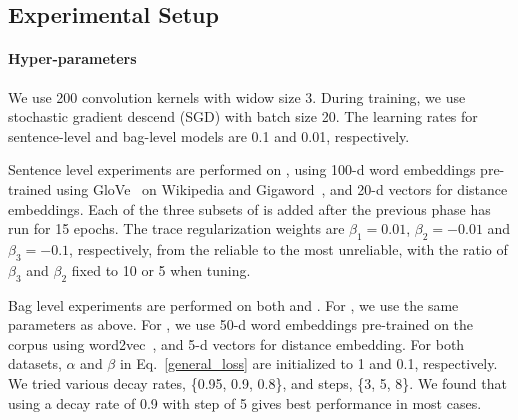 \subsection{Experimental Setup}
%
%
\paragraph{Hyper-parameters}
We use 200 convolution kernels with widow size 3. During training, we use stochastic gradient descend (SGD) with batch size 20.  The learning rates for sentence-level  and bag-level models are 0.1 and 0.01, respectively.
%
%

Sentence level experiments are performed on \TimeRE, 
using %
100-d word embeddings pre-trained using GloVe~\cite{pennington2014glove} on Wikipedia and Gigaword~\cite{parker2011english}, 
and 20-d vectors for distance embeddings. Each of the three subsets of \TimeRE is added after the previous phase has run for 15 epochs. The trace regularization weights are $\beta_1=0.01$, $\beta_2=-0.01$ and $\beta_3=-0.1$, respectively, from the reliable to the most unreliable, with the ratio of $\beta_3$ and $\beta_2$ fixed to 10 or 5 when tuning.

Bag level experiments are performed on both  \TimeRE and  \EntityRE. For \TimeRE, we use the same parameters as above.
For \EntityRE, we use 50-d word embeddings pre-trained on the \NYT corpus using word2vec~\cite{mikolov2013distributed}, 
and 5-d vectors for distance embedding.
For both datasets,  $\alpha$ and $\beta$ in Eq.~\ref{general_loss} are initialized to 1 and 0.1, respectively. We tried various decay rates, \{0.95, 0.9, 0.8\}, and steps, \{3, 5, 8\}. We found that using a decay rate of 0.9 with step of 5 gives best performance in most cases.

